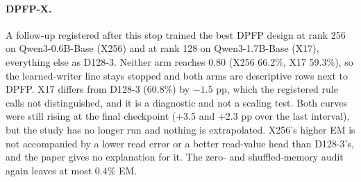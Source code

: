 \paragraph{DPFP-X.}
A follow-up registered after this stop trained the best DPFP design at rank 256 on Qwen3-0.6B-Base (X256) and at rank 128 on Qwen3-1.7B-Base (X17), everything else as D128-3.
Neither arm reaches 0.80 (X256 66.2\%, X17 59.3\%), so the learned-writer line stays stopped and both arms are descriptive rows next to DPFP.  %
X17 differs from D128-3 (60.8\%) by $-1.5$ pp, which the registered rule calls not distinguished, and it is a diagnostic and not a scaling test.  %
Both curves were still rising at the final checkpoint (+3.5 and +2.3 pp over the last interval), but the study has no longer run and nothing is extrapolated.  %
X256's higher EM is not accompanied by a lower read error or a better read-value head than D128-3's, and the paper gives no explanation for it.  %
The zero- and shuffled-memory audit again leaves at most 0.4\% EM.  %

